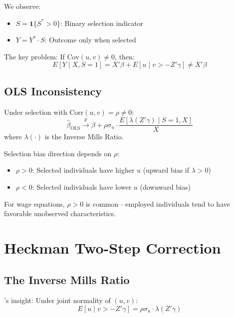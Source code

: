 We observe:
\begin{itemize}
\item $S = \mathbf{1}\{S^* > 0\}$: Binary selection indicator
\item $Y = Y^* \cdot S$: Outcome only when selected
\end{itemize}

The key problem: If $\text{Cov}(u, v) \neq 0$, then:
\begin{equation}
E[Y \mid X, S=1] = X'\beta + E[u \mid v > -Z'\gamma] \neq X'\beta
\end{equation}

\subsection{OLS Inconsistency}

\begin{proposition}
Under selection with $\text{Corr}(u, v) = \rho \neq 0$:
\begin{equation}
\hat{\beta}_{\text{OLS}} \xrightarrow{p} \beta + \rho \sigma_u \cdot \frac{E[\lambda(Z'\gamma) \mid S=1, X]}{X}
\end{equation}
where $\lambda(\cdot)$ is the Inverse Mills Ratio.
\end{proposition}

\begin{insight}
Selection bias direction depends on $\rho$:
\begin{itemize}
\item $\rho > 0$: Selected individuals have higher $u$ (upward bias if $\lambda > 0$)
\item $\rho < 0$: Selected individuals have lower $u$ (downward bias)
\end{itemize}
For wage equations, $\rho > 0$ is common---employed individuals tend to have favorable unobserved characteristics.
\end{insight}


\section{Heckman Two-Step Correction}

\subsection{The Inverse Mills Ratio}

\textcite{heckman1979sample}'s insight: Under joint normality of $(u, v)$:
\begin{equation}
E[u \mid v > -Z'\gamma] = \rho \sigma_u \cdot \lambda(Z'\gamma)
\end{equation}

